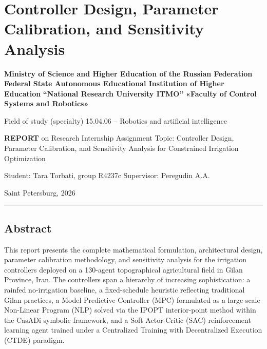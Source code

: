 \section{Controller Design, Parameter Calibration, and Sensitivity
Analysis}\label{controller-design-parameter-calibration-and-sensitivity-analysis}

\textbf{Ministry of Science and Higher Education of the Russian
Federation} \textbf{Federal State Autonomous Educational Institution of
Higher Education} \textbf{``National Research University ITMO''}
\textbf{«Faculty of Control Systems and Robotics»}

Field of study (specialty) 15.04.06 -- Robotics and artificial
intelligence

\textbf{REPORT} on Research Internship Assignment Topic: Controller
Design, Parameter Calibration, and Sensitivity Analysis for Constrained
Irrigation Optimization

Student: Tara Torbati, group R4237c Supervisor: Peregudin A.A.

Saint Petersburg, 2026

\begin{center}\rule{0.5\linewidth}{0.5pt}\end{center}

\subsection{Abstract}\label{abstract}

This report presents the complete mathematical formulation,
architectural design, parameter calibration methodology, and sensitivity
analysis for the irrigation controllers deployed on a 130-agent
topographical agricultural field in Gilan Province, Iran. The
controllers span a hierarchy of increasing sophistication: a rainfed
no-irrigation baseline, a fixed-schedule heuristic reflecting
traditional Gilan practices, a Model Predictive Controller (MPC)
formulated as a large-scale Non-Linear Program (NLP) solved via the
IPOPT interior-point method within the CasADi symbolic framework, and a
Soft Actor-Critic (SAC) reinforcement learning agent trained under a
Centralized Training with Decentralized Execution (CTDE) paradigm.

